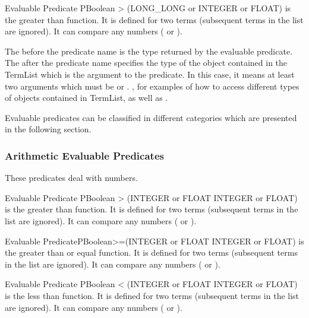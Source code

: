 \begin{typeep}{Evaluable Predicate} {PBoolean} {>} {(LONG\_LONG or INTEGER or FLOAT)}
is the greater than function. It is defined for two terms (subsequent
terms in the list are ignored). It can compare any numbers ( or
).
\end{typeep}

The  before the predicate name \code{>} is the type returned
by the evaluable predicate.  The 
after the predicate name specifies the type of the object contained in the
TermList which is the argument to the \code{>} predicate. In this case, it
means at least two arguments which must be  or 
.  , for examples of how to access
different types of objects contained in TermList, as well as .

Evaluable predicates can be classified in different categories which are
presented in the following section.



\subsubsection{Arithmetic Evaluable Predicates}

These predicates deal with numbers.

\begin{typeep}{Evaluable Predicate} {PBoolean} {>} {(INTEGER or FLOAT INTEGER or FLOAT)}
is the greater than function. It is defined for two terms (subsequent
terms in the list are ignored). It can compare any numbers ( or
).
\end{typeep}

\begin{typeep}{Evaluable Predicate}{PBoolean}{>=}{(INTEGER or FLOAT INTEGER or FLOAT)}
is the greater than or equal function. It is defined for two terms
(subsequent terms in the list are ignored). It can compare any numbers
( or ).
\end{typeep}

\begin{typeep}{Evaluable Predicate} {PBoolean} {<} {(INTEGER or FLOAT INTEGER or FLOAT)}
is the less than function. It is defined for two terms (subsequent terms
in the list are ignored). It can compare any numbers ( or ).
\end{typeep}

